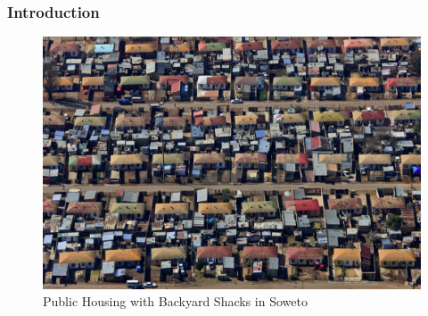 \documentclass[aspectratio=149]{beamer}
\begin{document}

\begin{frame}
\frametitle{Introduction}
\centering

\begin{figure}
 \includegraphics[scale=.25]{shacks.jpg} 
 \caption{Public Housing with Backyard Shacks in Soweto}
\end{figure}

\end{frame}

\end{document}
